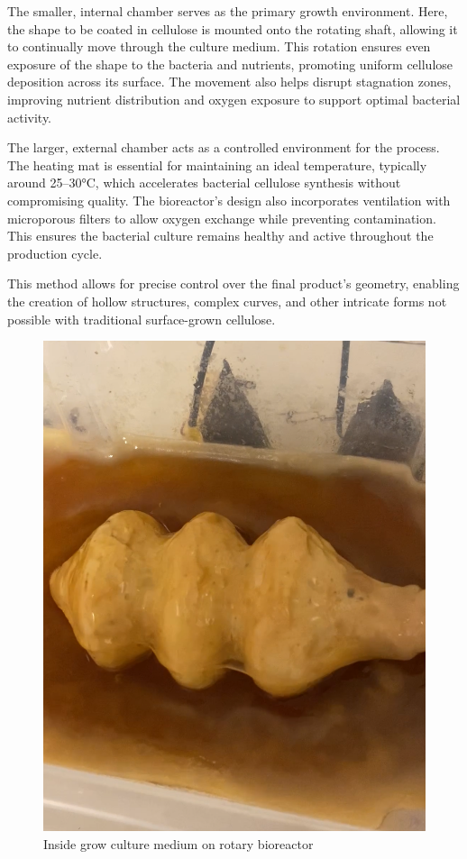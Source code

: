 The smaller, internal chamber serves as the primary growth environment. Here, the shape to be coated in cellulose is mounted onto the rotating shaft, allowing it to continually move through the culture medium. This rotation ensures even exposure of the shape to the bacteria and nutrients, promoting uniform cellulose deposition across its surface. The movement also helps disrupt stagnation zones, improving nutrient distribution and oxygen exposure to support optimal bacterial activity.

The larger, external chamber acts as a controlled environment for the process. The heating mat is essential for maintaining an ideal temperature, typically around 25–30°C, which accelerates bacterial cellulose synthesis without compromising quality. The bioreactor's design also incorporates ventilation with microporous filters to allow oxygen exchange while preventing contamination. This ensures the bacterial culture remains healthy and active throughout the production cycle.

This method allows for precise control over the final product's geometry, enabling the creation of hollow structures, complex curves, and other intricate forms not possible with traditional surface-grown cellulose. 
\begin{figure}[h]
    \centering
    \includegraphics{images/insiderotary.png}
    \caption{Inside grow culture medium on rotary bioreactor}
    \label{fig:roryinside}
\end{figure} 

